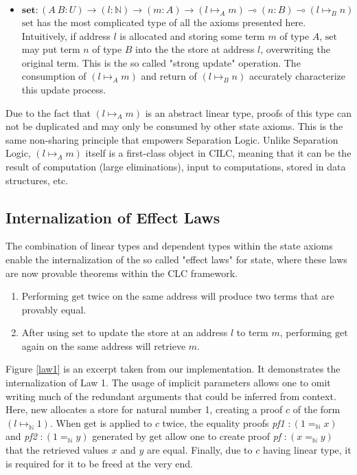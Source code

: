\documentclass[sigplan,screen,review,authordraft]{acmart}
\newcommand{\new}{\text{new}}
\newcommand{\get}{\text{get}}
\newcommand{\set}{\text{set}}
\begin{document}
\begin{definition}
\begin{itemize}
    \item $\textbf{set} : (A\ B : U) \rightarrow (l : \mathbb{N}) \rightarrow (m : A) \rightarrow (l \mapsto_A m) \multimap (n : B) \multimap (l \mapsto_B n)$ \\
          $\set$ has the most complicated type of all the axioms presented here. Intuitively, if address $l$ is allocated and storing some term $m$ of type $A$, $\set$ may put term $n$ of type $B$ into the the store at address $l$, overwriting the original term. This is the so called "strong update" operation. The consumption of $(l \mapsto_A m)$ and return of $(l \mapsto_B n)$ accurately characterize this update process.
  \end{itemize}
\end{definition}
Due to the fact that $(l \mapsto_A m)$ is an abstract linear type, proofs of this type can not be duplicated and may only be consumed by other state axioms. This is the same non-sharing principle that empowers Separation Logic. Unlike Separation Logic, $(l \mapsto_A m)$ itself is a first-class object in CILC, meaning that it can be the result of computation (large eliminations), input to computations, stored in data structures, etc.

\subsection{Internalization of Effect Laws}
The combination of linear types and dependent types within the state axioms enable the internalization of the so called "effect laws" for state, where these laws are now provable theorems within the CLC framework.

\begin{enumerate}
  \item Performing $\get$ twice on the same address will produce two terms that are provably equal.
  \item After using $\set$ to update the store at an address $l$ to term $m$, performing $\get$ again on the same address will retrieve $m$.
\end{enumerate}

Figure \ref{law1} is an excerpt taken from our implementation. It demonstrates the internalization of Law 1. The usage of implicit parameters allows one to omit writing much of the redundant arguments that could be inferred from context. Here, $\new$ allocates a store for natural number 1, creating a proof $c$ of the form $(l \mapsto_\mathbb{N} 1)$. When $\get$ is applied to $c$ twice, the equality proofs \textit{pf1} $: (1 =_\mathbb{N} x)$ and \textit{pf2} $: (1 =_\mathbb{N} y)$ generated by $\get$ allow one to create proof \textit{pf} $: (x =_\mathbb{N} y)$ that the retrieved values $x$ and $y$ are equal. Finally, due to $c$ having linear type, it is required for it to be freed at the very end.
\end{document}
